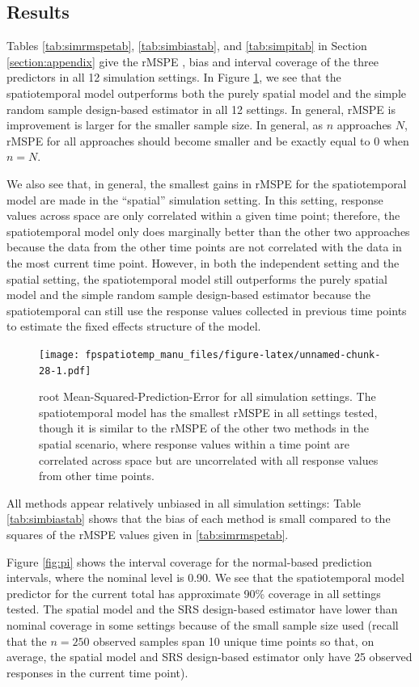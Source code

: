 \documentclass[]{interact}
\theoremstyle{plain}%
\theoremstyle{definition}
\theoremstyle{remark}
\begin{document}
\subsection{Results}

Tables \ref{tab:simrmspetab}, \ref{tab:simbiastab}, and
\ref{tab:simpitab} in Section \ref{section:appendix} give the rMSPE ,
bias and interval coverage of the three predictors in all 12 simulation
settings. In Figure \ref{fig:rmspe}, we see that the spatiotemporal
model outperforms both the purely spatial model and the simple random
sample design-based estimator in all 12 settings. In general, rMSPE is
improvement is larger for the smaller sample size. In general, as \(n\)
approaches \(N\), rMSPE for all approaches should become smaller and be
exactly equal to 0 when \(n = N\).

We also see that, in general, the smallest gains in rMSPE for the
spatiotemporal model are made in the ``spatial'' simulation setting. In
this setting, response values across space are only correlated within a
given time point; therefore, the spatiotemporal model only does
marginally better than the other two approaches because the data from
the other time points are not correlated with the data in the most
current time point. However, in both the independent setting and the
spatial setting, the spatiotemporal model still outperforms the purely
spatial model and the simple random sample design-based estimator
because the spatiotemporal can still use the response values collected
in previous time points to estimate the fixed effects structure of the
model.

\begin{figure}
\centering
\texttt{[image: fpspatiotemp\_manu\_files/figure-latex/unnamed-chunk-28-1.pdf]}
\caption{\label{fig:rmspe} root Mean-Squared-Prediction-Error for all
simulation settings. The spatiotemporal model has the smallest rMSPE in
all settings tested, though it is similar to the rMSPE of the other two
methods in the spatial scenario, where response values within a time
point are correlated across space but are uncorrelated with all response
values from other time points.}
\end{figure}

All methods appear relatively unbiased in all simulation settings: Table
\ref{tab:simbiastab} shows that the bias of each method is small
compared to the squares of the rMSPE values given in
\ref{tab:simrmspetab}.

Figure \ref{fig:pi} shows the interval coverage for the normal-based
prediction intervals, where the nominal level is 0.90. We see that the
spatiotemporal model predictor for the current total has approximate
90\% coverage in all settings tested. The spatial model and the SRS
design-based estimator have lower than nominal coverage in some settings
because of the small sample size used (recall that the \(n = 250\)
observed samples span 10 unique time points so that, on average, the
spatial model and SRS design-based estimator only have 25 observed
responses in the current time point).
\end{document}
